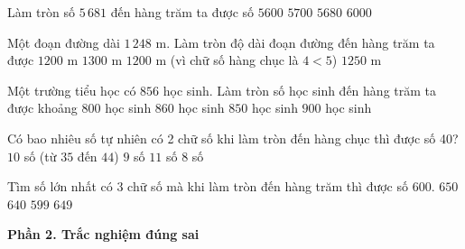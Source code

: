 \begin{ex} %
Làm tròn số $5\,681$ đến hàng trăm ta được số
\choice
{$5600$}
{\True $5700$}
{$5680$}
{$6000$}
\end{ex}

\begin{ex} %
Một đoạn đường dài $1\,248\text{ m}$. Làm tròn độ dài đoạn đường đến hàng trăm ta được
\choice
{$1200\text{ m}$}
{$1300\text{ m}$}
{\True $1200\text{ m}$ (vì chữ số hàng chục là $4 < 5$)}
{$1250\text{ m}$}
\end{ex}

\begin{ex} %
Một trường tiểu học có $856$ học sinh. Làm tròn số học sinh đến hàng trăm ta được khoảng
\choice
{$800$ học sinh}
{$860$ học sinh}
{$850$ học sinh}
{\True $900$ học sinh}
\end{ex}

\begin{ex} %
Có bao nhiêu số tự nhiên có 2 chữ số khi làm tròn đến hàng chục thì được số 40?
\choice
{\True $10$ số (từ $35$ đến $44$)}
{$9$ số}
{$11$ số}
{$8$ số}
\end{ex}

\begin{ex} %
Tìm số lớn nhất có 3 chữ số mà khi làm tròn đến hàng trăm thì được số 600.
\choice
{$650$}
{$640$}
{$599$}
{\True $649$}
\end{ex}

\textbf{Phần 2. Trắc nghiệm đúng sai}

